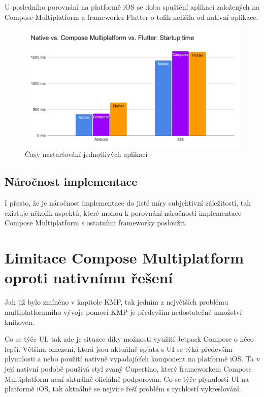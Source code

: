 U posledního porovnání na platformě iOS se doba spuštění aplikací založených na Compose Multiplatform a frameworku 
Flutter o tolik nelišila od nativní aplikace.


\begin{figure}[H]
  \centering
  \includegraphics[width=.7\textwidth]{chart_startup_times.png}
  \caption{Časy nastartování jednotlivých aplikací}
  \label{fig:chart_startup_times}
\end{figure}

\subsection{Náročnost implementace}
I přesto, že je náročnost implementace do jisté míry subjektivní záležitostí, tak existuje několik aspektů, které mohou k porovnání 
náročnosti implementace Compose Multiplatform s ostatními frameworky posloužit. 



\section{Limitace Compose Multiplatform oproti nativnímu řešení} 
Jak již bylo zmíněno v kapitole KMP, tak jedním z největších problému multiplatformního vývoje pomocí KMP je
především nedostatečné množství knihoven. 

Co se týče UI, tak zde je situace díky možnosti využití Jetpack Compose o něco lepší. Většina omezení, která jsou
aktuálně spjata s UI se týká především plynulosti a nebo použití nativně vypadajících komponent na platformě iOS.
Ta v její nativní podobě používá styl zvaný Cupertino, který frameworkem Compose Multiplatform není aktuálně oficiálně podporován. 
Co se týče plynulosti UI na platformě iOS, tak aktuálně se nejvíce řeší problém s rychlostí vykreslování.

